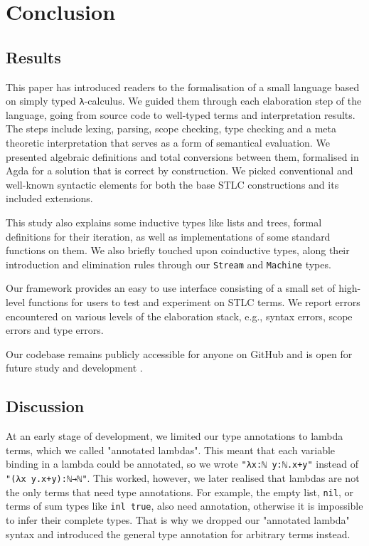 \chapter{Conclusion}
\label{ch:conclusion}

\section{Results}

This paper has introduced readers to the formalisation of a small language based on simply typed \verb$λ$-calculus. We guided them through each elaboration step of the language, going from source code to well-typed terms and interpretation results. The steps include lexing, parsing, scope checking, type checking and a meta theoretic interpretation that serves as a form of semantical evaluation. We presented algebraic definitions and total conversions between them, formalised in Agda for a solution that is correct by construction. We picked conventional and well-known syntactic elements for both the base STLC constructions and its included extensions.

This study also explains some inductive types like lists and trees, formal definitions for their iteration, as well as implementations of some standard functions on them. We also briefly touched upon coinductive types, along their introduction and elimination rules through our \verb$Stream$ and \verb$Machine$ types.

Our framework provides an easy to use interface consisting of a small set of high-level functions for users to test and experiment on STLC terms. We report errors encountered on various levels of the elaboration stack, e.g., syntax errors, scope errors and type errors.

Our codebase remains publicly accessible for anyone on GitHub and is open for future study and development \cite{home-repo}.

\section{Discussion}

At an early stage of development, we limited our type annotations to lambda terms, which we called "annotated lambdas". This meant that each variable binding in a lambda could be annotated, so we wrote \verb$"λx:ℕ y:ℕ.x+y"$ instead of \verb$"(λx y.x+y):ℕ→ℕ"$. This worked, however, we later realised that lambdas are not the only terms that need type annotations. For example, the empty list, \verb$nil$, or terms of sum types like \verb$inl true$, also need annotation, otherwise it is impossible to infer their complete types. That is why we dropped our "annotated lambda" syntax and introduced the general type annotation for arbitrary terms instead.

